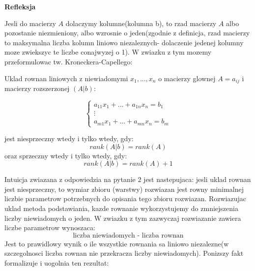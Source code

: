 \documentclass{article}
\begin{document}
\textbf{Refleksja}

Jesli do macierzy $A$ dolaczymy kolumne(kolumna b), to rzad macierzy $A$ albo pozostanie niezmieniony, albo wzrosnie o jeden(zgodnie z definicja, rzad macierzy to maksymalna liczba kolumn liniowo niezaleznych- dolaczenie jedenej kolumny moze zwiekszyc te liczbe conajwyzej o 1). W zwiazku z tym mozemy przeformulowac tw. Kroneckera-Capellego:

\begin{tcolorbox}[colback=white!90!blue,colframe=black!35!blue,title=Twierdzenie Kroneckera-Capellego v2]

Uklad rownan liniowych z niewiadomymi $x_{1},...,x_{n}$ o macierzy glownej $A = a_{ij}$ i macierzy rozszerzonej $(A|b)$:

$$ \begin{cases}
a_{11}x_{1} + ... + a_{1n}x_{n} = b_{1} \\
\vdots \\
a_{m1}x_{1} + ... + a_{mn}x_{n} = b_{m}
\end{cases} $$

jest niesprzeczny wtedy i tylko wtedy, gdy:
$$rank(A|b) = rank(A) $$
oraz sprzeczny wtedy i tylko wtedy, gdy:
$$rank(A|b) = rank(A) + 1$$

\end{tcolorbox}

Intuicja zwiazana z odpowiedzia na pytanie 2 jest nastepujaca: jesli uklad rownan jest niesprzeczny, to wymiar zbioru (warstwy) rozwiazan jest rowny minimalnej liczbie parametrow potrzebnych do opisania tego zbioru rozwiazan. Rozwiazujac uklad metoda podstawiania, kazde rownanie wykorzystujemy do zmniejszenia liczby niewiadomych o jeden. W zwiazku z tym zazwyczaj rozwiazanie zawiera liczbe parametrow wynoszaca: $$\text{liczba niewiadomych - liczba rownan}$$
Jest to prawidlowy wynik o ile wszystkie rownania sa liniowo niezalezne(w szczegolnosci liczba rownan nie przekracza liczby niewiadomych). Ponizszy fakt formalizuje i uogolnia ten rezultat:
\end{document}
